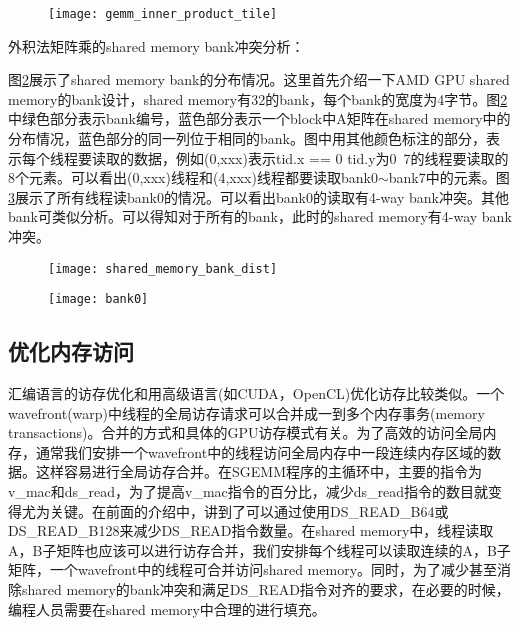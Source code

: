 \begin{figure}[htbp]
	\centering
	\texttt{[image: gemm\_inner\_product\_tile]}
	\label{fig:gemm_inner_product_tile}
\end{figure}

外积法矩阵乘的shared memory bank冲突分析：

图\ref{fig:shared_memory_bank_dist}展示了shared memory bank的分布情况。这里首先介绍一下AMD GPU shared memory的bank设计，shared memory有32的bank，每个bank的宽度为4字节。图\ref{fig:shared_memory_bank_dist}中绿色部分表示bank编号，蓝色部分表示一个block中A矩阵在shared memory中的分布情况，蓝色部分的同一列位于相同的bank。图中用其他颜色标注的部分，表示每个线程要读取的数据，例如(0,xxx)表示tid.x == 0 tid.y为0~7的线程要读取的8个元素。可以看出(0,xxx)线程和(4,xxx)线程都要读取bank0$\sim$bank7中的元素。图\ref{fig:bank0}展示了所有线程读bank0的情况。可以看出bank0的读取有4-way bank冲突。其他bank可类似分析。可以得知对于所有的bank，此时的shared memory有4-way bank冲突。



\begin{figure}[htbp]
	\centering
	\texttt{[image: shared\_memory\_bank\_dist]}
	\label{fig:shared_memory_bank_dist}
\end{figure}

\begin{figure}[htbp]
	\centering
	\texttt{[image: bank0]}
	\label{fig:bank0}
\end{figure}

\subsection{优化内存访问}
汇编语言的访存优化和用高级语言(如CUDA，OpenCL)优化访存比较类似。一个wavefront(warp)中线程的全局访存请求可以合并成一到多个内存事务(memory transactions)。合并的方式和具体的GPU访存模式有关。为了高效的访问全局内存，通常我们安排一个wavefront中的线程访问全局内存中一段连续内存区域的数据。这样容易进行全局访存合并。在SGEMM程序的主循环中，主要的指令为v\_mac和ds\_read，为了提高v\_mac指令的百分比，减少ds\_read指令的数目就变得尤为关键。在前面的介绍中，讲到了可以通过使用DS\_READ\_B64或DS\_READ\_B128来减少DS\_READ指令数量。在shared memory中，线程读取A，B子矩阵也应该可以进行访存合并，我们安排每个线程可以读取连续的A，B子矩阵，一个wavefront中的线程可合并访问shared memory。同时，为了减少甚至消除shared memory的bank冲突和满足DS\_READ指令对齐的要求，在必要的时候，编程人员需要在shared memory中合理的进行填充。


